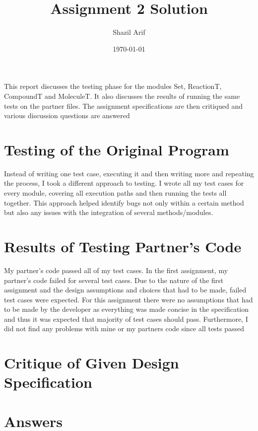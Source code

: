 \documentclass[12pt]{article}
\title{Assignment 2 Solution}
\author{Shazil Arif}
\date{\today}
\begin{document}
\maketitle

This report discusses the testing phase for the modules Set, ReactionT, CompoundT and MoleculeT. It also discusses
the results of running the same tests on the partner files. The assignment specifications
are then critiqued and various discussion questions are answered

\section{Testing of the Original Program}


Instead of writing one test case, executing it and then writing more and repeating the process, I took a different approach to testing. I wrote all my test cases for every module, covering all execution paths and then running the tests all together. This approach helped identify bugs not only within a certain method but also any issues with the integration of several methods/modules.


\section{Results of Testing Partner's Code}

My partner's code passed all of my test cases. In the first assignment, my partner's code failed for several test cases. Due to the nature of the first assignment and the design assumptions and choices that had to be made, failed test cases were expected. For this assignment there were no assumptions that had to be made by the developer as everything was made concise in the specification and thus it was expected that majority of test cases should pass. Furthermore, I did not find any problems with mine or my partners code since all tests passed

\section{Critique of Given Design Specification}

\section{Answers}
\end{document}
